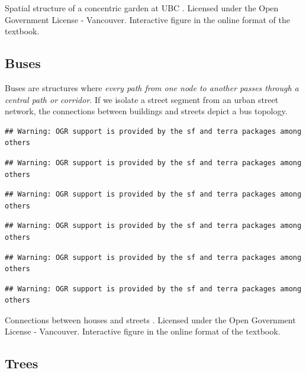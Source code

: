 \documentclass[
]{book}
\begin{document}
\label{fig:8-spatial-structure-garden}Spatial structure of a concentric garden at UBC \citep{city_of_vancouver_open_nodate}. Licensed under the Open Government License - Vancouver. Interactive figure in the online format of the textbook.

\hypertarget{buses}{%
\subsection{Buses}\label{buses}}

Buses are structures where \emph{every path from one node to another passes through a central path or corridor}. If we isolate a street segment from an urban street network, the connections between buildings and streets depict a bus topology.

\begin{verbatim}
## Warning: OGR support is provided by the sf and terra packages among others
\end{verbatim}

\begin{verbatim}
## Warning: OGR support is provided by the sf and terra packages among others
\end{verbatim}

\begin{verbatim}
## Warning: OGR support is provided by the sf and terra packages among others
\end{verbatim}

\begin{verbatim}
## Warning: OGR support is provided by the sf and terra packages among others
\end{verbatim}

\begin{verbatim}
## Warning: OGR support is provided by the sf and terra packages among others
\end{verbatim}

\begin{verbatim}
## Warning: OGR support is provided by the sf and terra packages among others
\end{verbatim}

\label{fig:8-connections-houses-streets}Connections between houses and streets \citep{city_of_vancouver_open_nodate}. Licensed under the Open Government License - Vancouver. Interactive figure in the online format of the textbook.

\hypertarget{trees}{%
\subsection{Trees}\label{trees}}
\end{document}

